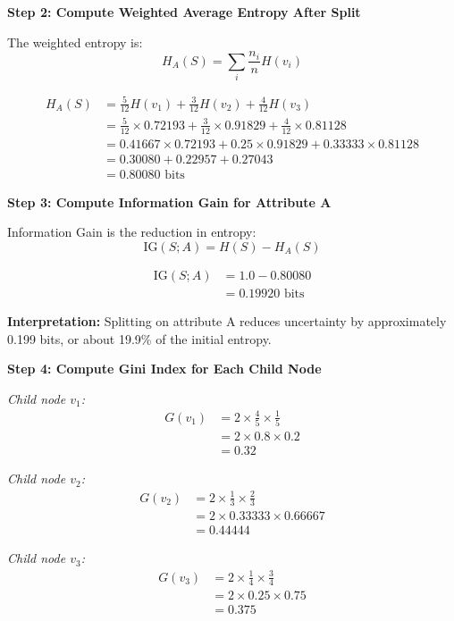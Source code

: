 \documentclass[12pt]{article}
\begin{document}
\begin{solution}
\textbf{Step 2: Compute Weighted Average Entropy After Split}

The weighted entropy is:
\[
H_A(S) = \sum_{i} \frac{n_i}{n} H(v_i)
\]

\begin{align*}
H_A(S) &= \frac{5}{12} H(v_1) + \frac{3}{12} H(v_2) + \frac{4}{12} H(v_3) \\
&= \frac{5}{12} \times 0.72193 + \frac{3}{12} \times 0.91829 + \frac{4}{12} \times 0.81128 \\
&= 0.41667 \times 0.72193 + 0.25 \times 0.91829 + 0.33333 \times 0.81128 \\
&= 0.30080 + 0.22957 + 0.27043 \\
&= 0.80080 \text{ bits}
\end{align*}

\textbf{Step 3: Compute Information Gain for Attribute A}

Information Gain is the reduction in entropy:
\[
\text{IG}(S; A) = H(S) - H_A(S)
\]

\begin{align*}
\text{IG}(S; A) &= 1.0 - 0.80080 \\
&= 0.19920 \text{ bits}
\end{align*}

\textbf{Interpretation:} Splitting on attribute A reduces uncertainty by approximately 0.199 bits, or about 19.9\% of the initial entropy.

\textbf{Step 4: Compute Gini Index for Each Child Node}

\textit{Child node $v_1$:}
\begin{align*}
G(v_1) &= 2 \times \frac{4}{5} \times \frac{1}{5} \\
&= 2 \times 0.8 \times 0.2 \\
&= 0.32
\end{align*}

\textit{Child node $v_2$:}
\begin{align*}
G(v_2) &= 2 \times \frac{1}{3} \times \frac{2}{3} \\
&= 2 \times 0.33333 \times 0.66667 \\
&= 0.44444
\end{align*}

\textit{Child node $v_3$:}
\begin{align*}
G(v_3) &= 2 \times \frac{1}{4} \times \frac{3}{4} \\
&= 2 \times 0.25 \times 0.75 \\
&= 0.375
\end{align*}


\end{solution}
\end{document}
